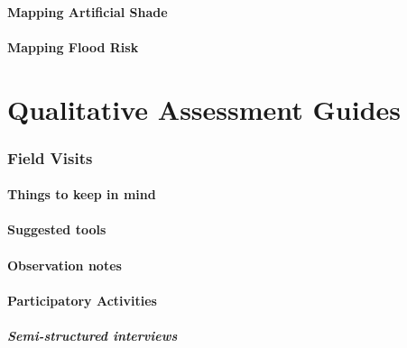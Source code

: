 \documentclass[
]{latex/krantz}
\begin{document}
\hypertarget{mapping-artificial-shade}{%
\subsection{Mapping Artificial Shade}\label{mapping-artificial-shade}}

\hypertarget{mapping-flood-risk}{%
\subsection{Mapping Flood Risk}\label{mapping-flood-risk}}

\hypertarget{part-qualitative-assessment-guides}{%
\part{Qualitative Assessment Guides}\label{part-qualitative-assessment-guides}}

\hypertarget{field-visits}{%
\section{Field Visits}\label{field-visits}}

\hypertarget{things-to-keep-in-mind}{%
\subsection{Things to keep in mind}\label{things-to-keep-in-mind}}

\hypertarget{suggested-tools}{%
\subsection{Suggested tools}\label{suggested-tools}}

\hypertarget{observation-notes}{%
\subsection{Observation notes}\label{observation-notes}}

\hypertarget{participatory-activities}{%
\subsection{Participatory Activities}\label{participatory-activities}}

\hypertarget{semi-structured-interviews}{%
\subsubsection{Semi-structured interviews}\label{semi-structured-interviews}}
\end{document}
